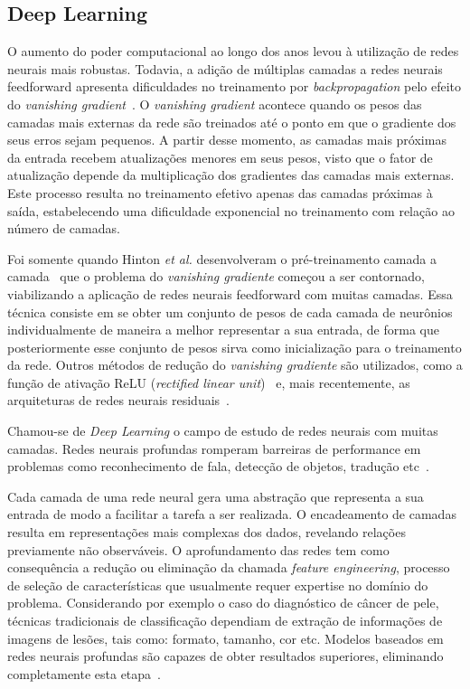 \subsection{Deep Learning}

O aumento do poder computacional ao longo dos anos levou à utilização de redes neurais mais robustas.
Todavia, a adição de múltiplas camadas a redes neurais feedforward apresenta dificuldades no treinamento por
\textit{backpropagation} pelo efeito do \textit{vanishing gradient}~\cite{hochreiter98}.
O \textit{vanishing gradient} acontece quando os pesos das camadas mais externas da rede são treinados até o ponto em
que o gradiente dos seus erros sejam pequenos.
A partir desse momento, as camadas mais próximas da entrada recebem atualizações menores em seus pesos, visto que o fator
de atualização depende da multiplicação dos gradientes das camadas mais externas.
Este processo resulta no treinamento efetivo apenas das camadas próximas à saída, estabelecendo uma dificuldade
exponencial no treinamento com relação ao número de camadas.

Foi somente quando Hinton \textit{et al.} desenvolveram o pré-treinamento camada a camada~\cite{hinton06} que o problema
do \textit{vanishing gradiente} começou a ser contornado, viabilizando a aplicação de redes neurais feedforward com muitas
camadas.
Essa técnica consiste em se obter um conjunto de pesos de cada camada de neurônios individualmente de maneira a melhor
representar a sua entrada, de forma que posteriormente esse conjunto de pesos sirva como inicialização para o
treinamento da rede.
Outros métodos de redução do \textit{vanishing gradiente} são utilizados, como a função de ativação ReLU
(\textit{rectified linear unit})~\cite{nair10} e, mais recentemente, as arquiteturas de redes neurais
residuais~\cite{he16}.

Chamou-se de \textit{Deep Learning} o campo de estudo de redes neurais com muitas camadas.
Redes neurais profundas romperam barreiras de performance em problemas como reconhecimento de fala, detecção de
objetos, tradução etc~\cite{lecun15}.

Cada camada de uma rede neural gera uma abstração que representa a sua entrada de modo a facilitar a tarefa a ser
realizada.
O encadeamento de camadas resulta em representações mais complexas dos dados, revelando relações previamente não
observáveis.
O aprofundamento das redes tem como consequência a redução ou eliminação da chamada \textit{feature engineering},
processo de seleção de características que usualmente requer expertise no domínio do problema.
Considerando por exemplo o caso do diagnóstico de câncer de pele, técnicas tradicionais de classificação dependiam de
extração de informações de imagens de lesões, tais como: formato, tamanho, cor etc.
Modelos baseados em redes neurais profundas são capazes de obter resultados superiores, eliminando completamente esta
etapa~\cite{esteva17}.

